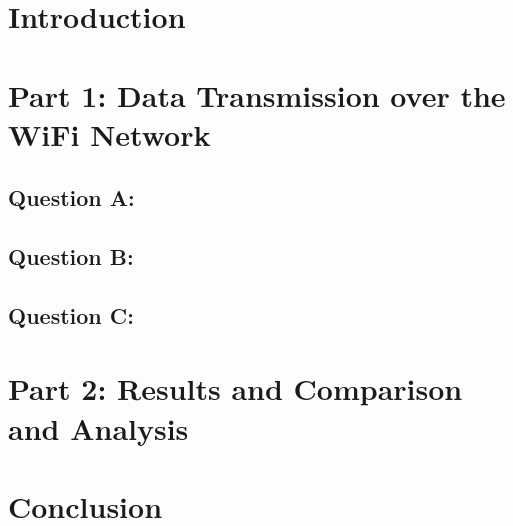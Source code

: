 \documentclass[a4paper]{article}
\begin{document}
\hypersetup{pageanchor=false}

\hypersetup{pageanchor=true}


\tableofcontents
\clearpage
\section{Introduction}

\section{Part 1: Data Transmission over the WiFi Network}
\subsection{Question A:}


\subsection{Question B:}

\subsection{Question C:}



\section{Part 2: Results and Comparison and Analysis}

\section{Conclusion}

\clearpage
\printbibliography
\end{document}
